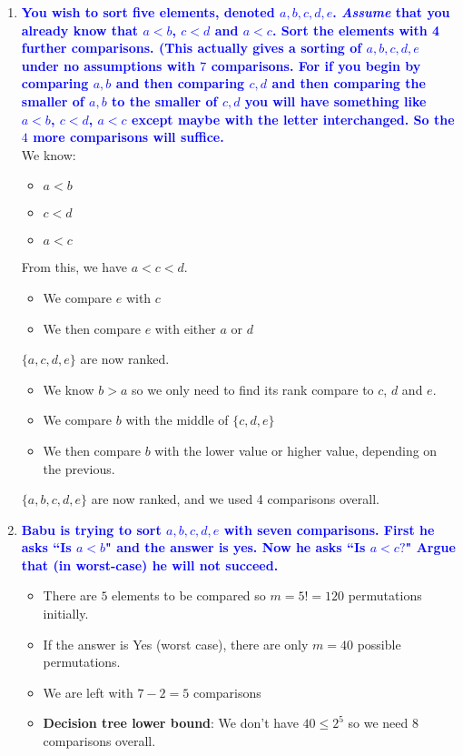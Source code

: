 \documentclass[11pt]{article}
\begin{document}
\begin{enumerate}
\item \textbf{\textcolor{blue}{You wish to sort five elements, denoted $a,b,c,d,e$. {\em Assume} that you already know that $a<b$, $c<d$ and $a<c$. Sort the elements with 4 further comparisons. (This actually gives a sorting of $a,b,c,d,e$ under no assumptions with $7$ comparisons. For if you begin by comparing $a,b$ and then comparing $c,d$ and then comparing the smaller of $a,b$ to the smaller of $c,d$ you will have something like $a<b$, $c<d$, $a<c$ except maybe with the letter interchanged. So the $4$ more comparisons will suffice.}}
    \\ We know:
    \begin{itemize}
        \item $a < b$
        \item $c < d$
        \item $a < c$
    \end{itemize}
    From this, we have $a < c < d$.
    \begin{itemize}
        \item We compare $e$ with $c$
        \item We then compare $e$ with either $a$ or $d$
    \end{itemize}
    $\{a, c, d, e\}$ are now ranked.
    \begin{itemize}
        \item We know $b > a$ so we only need to find its rank compare to $c$, $d$ and $e$.
        \item We compare $b$ with the middle of $\{c,d,e\}$
        \item We then compare $b$ with the lower value or higher value, depending on the previous.
    \end{itemize}
    $\{a, b, c, d, e\}$ are now ranked, and we used 4 comparisons overall.

\item \textbf{\textcolor{blue}{Babu is trying to sort $a,b,c,d,e$ with seven comparisons.  First
he asks ``Is $a  < b$" and the answer is yes.  Now he asks ``Is $a < c?$"
Argue that (in worst-case) he will not succeed.}}
    \begin{itemize}
        \item There are $5$ elements to be compared so $m = 5! = 120$ permutations initially.
        \item If the answer is Yes (worst case), there are only $m = 40$ possible permutations.
        \item We are left with $7 - 2 = 5$ comparisons
        \item \textbf{Decision tree lower bound}: We don't have $40 \leq 2^5$ so we need 8 comparisons overall.
    \end{itemize}
    

\end{enumerate}
\end{document}
